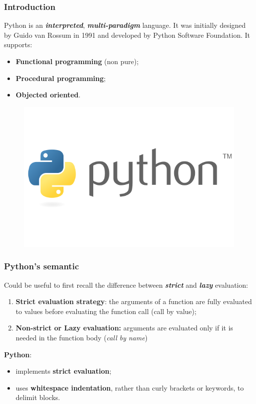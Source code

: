 \documentclass[xcolor ={table,usenames,dvipsnames}]{beamer}
\theoremstyle{definition}
\begin{document}
	\begin{frame}
		\frametitle{Introduction}
		Python is an \textit{\textbf{interpreted}}, \textit{\textbf{multi-paradigm}} language. It was initially designed by Guido van Rossum in 1991 and developed by Python Software Foundation. It supports:
		\begin{itemize}
			\item \textbf{Functional programming } (non pure);
			\item \textbf{Procedural programming};
			\item \textbf{Objected oriented}.
		\end{itemize}
		\begin{figure}[]
			\centering
			\includegraphics[scale=0.3]{img/python.png}
			\label{Interfacce di un CS}
		\end{figure}
	\end{frame}

	\begin{frame}
		\frametitle{Python's semantic}
			Could be useful to first recall the difference between \textit{\textbf{strict}} and \textit{\textbf{lazy}} evaluation:
			\begin{enumerate}
				\item \textbf{Strict evaluation strategy}: the arguments of a function are fully evaluated to values before evaluating the function call (call by value);
				\item \textbf{Non-strict or Lazy evaluation:} arguments are evaluated only if it is needed in the function body (\textit{call by name})
			\end{enumerate}
			\textbf{Python}:		
			\begin{itemize}
				\item implements \textbf{strict evaluation};
				\item uses \textbf{whitespace indentation}, rather than curly brackets or keywords, to delimit blocks.
			\end{itemize}
	\end{frame}
\end{document}
